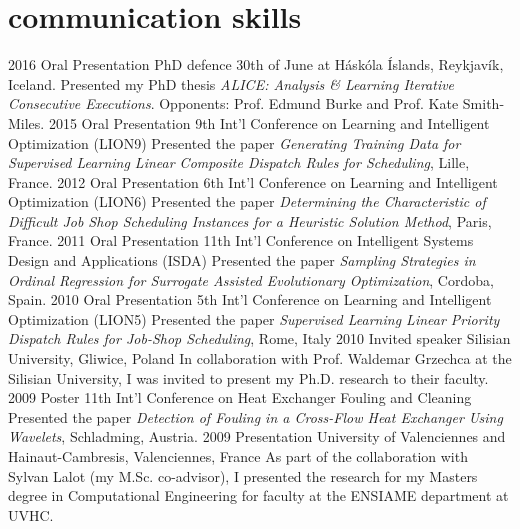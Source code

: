 \documentclass[]{cv} %
\begin{document}
\section{communication skills}
\begin{entrylist}
\entry
{2016}
{Oral Presentation}
{PhD defence 30th of June at Háskóla Íslands, Reykjavík, Iceland.}
{Presented my PhD thesis \emph{ALICE: Analysis \& Learning Iterative 
Consecutive Executions}. 
Opponents: Prof. Edmund Burke and Prof. Kate Smith-Miles.}
\entry
{2015}
{Oral Presentation}
{9th Int'l Conference on Learning and Intelligent Optimization (LION9)}
{Presented the paper \emph{ Generating Training Data for Supervised Learning 
Linear Composite Dispatch Rules for Scheduling}, Lille, France.}
\entry
{2012}
{Oral Presentation}
{6th Int'l Conference on Learning and Intelligent Optimization (LION6)}
{Presented the paper \emph{ Determining the Characteristic of Difficult Job 
Shop Scheduling Instances for a Heuristic Solution Method}, Paris,  France.}
\entry
{2011}
{Oral Presentation}
{11th Int'l Conference on Intelligent Systems Design and Applications (ISDA)}
{Presented the paper  \emph{Sampling Strategies in Ordinal Regression for 
Surrogate Assisted Evolutionary Optimization}, Cordoba, Spain.}
\entry
{2010}
{Oral Presentation}
{5th Int'l Conference on Learning and Intelligent Optimization (LION5)}
{Presented the paper \emph{Supervised Learning Linear Priority Dispatch Rules 
for Job-Shop Scheduling}, Rome, Italy}
\entry
{2010}
{Invited speaker}
{Silisian University, Gliwice, Poland}
{In collaboration with Prof. Waldemar Grzechca at the Silisian University, I was invited to present my Ph.D. research to their faculty.}
\entry
{2009}
{Poster}
{11th Int'l Conference on Heat Exchanger Fouling and Cleaning }
{Presented the paper \emph{Detection of Fouling in a Cross-Flow Heat Exchanger 
Using Wavelets}, Schladming, Austria.}
\entry
{2009}
{Presentation }
{University of Valenciennes and Hainaut-Cambresis, Valenciennes, France}
{As part of the collaboration with Sylvan Lalot (my M.Sc. co-advisor), I presented the research for my Masters degree in Computational Engineering
for faculty at the ENSIAME department at UVHC.}
\end{entrylist}
\end{document}
